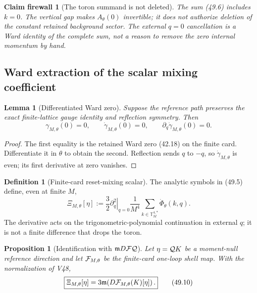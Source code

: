 \documentclass[11pt,oneside]{book}
\newtheorem{lemma}[theorem]{Lemma}
\newtheorem{proposition}[theorem]{Proposition}
\newtheorem{firewall}[theorem]{Claim firewall}
\theoremstyle{definition}
\newtheorem{definition}[theorem]{Definition}
\theoremstyle{remark}
\begin{document}
\begin{firewall}[The toron summand is not deleted]
\label{fire:e8v49-toron}
The sum (49.6) includes \(k=0\).  The vertical gap makes
\(A_\theta(0)\) invertible; it does not authorize deletion of the
constant retained background sector.  The external \(q=0\)
cancellation is a Ward identity of the complete sum, not a reason
to remove the zero internal momentum by hand.
\end{firewall}

\subsection{Ward extraction of the scalar mixing coefficient}

\begin{lemma}[Differentiated Ward zero]
\label{lem:e8v49-differentiated-Ward}
Suppose the reference path preserves the exact finite-lattice gauge
identity and reflection symmetry.  Then
\[
 \gamma_{M,\theta}(0)=0,\qquad
 \dot\gamma_{M,\theta}(0)=0,\qquad
 \partial_q\dot\gamma_{M,\theta}(0)=0.                        \tag{49.8}
\]
\end{lemma}

\begin{proof}
The first equality is the retained Ward zero (42.18) on the finite
card.  Differentiate it in \(\theta\) to obtain the second.
Reflection sends \(q\) to \(-q\), so
\(\dot\gamma_{M,\theta}\) is even; its first derivative at zero
vanishes.
\end{proof}

\begin{definition}[Finite-card reset-mixing scalar]
\label{def:e8v49-mixing-scalar}
The analytic symbols in (49.5) define, even at finite \(M\),
\[
 \boxed{
 \Xi_{M,\theta}[\eta]
 :=\frac32\left.\partial_q^2\right|_{q=0}
 \frac1{M^4}\sum_{k\in{\mathbb T}_M^{4,*}}
 \dot\Phi_\theta(k,q).}                                      \tag{49.9}
\]
The derivative acts on the trigonometric-polynomial continuation
in external \(q\); it is not a finite difference that drops the
toron.
\end{definition}

\begin{proposition}[Identification with
\(\mathfrak mD{\cal F}{\cal Q}\)]
\label{prop:e8v49-identification}
Let \(\eta={\cal Q}K\) be a moment-null reference direction and let
\({\cal F}_{M,\theta}\) be the finite-card one-loop shell map.
With the normalization of V48,
\[
 \boxed{
 \Xi_{M,\theta}[\eta]
 =3{\mathfrak m}\!\left(
 D{\cal F}_{M,\theta}(K)[\eta]\right).}                        \tag{49.10}
\]
\end{proposition}
\end{document}

